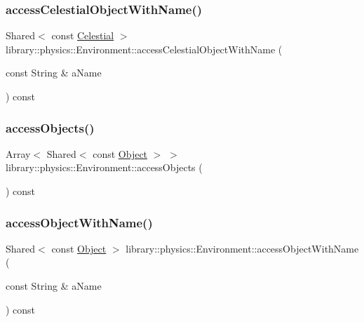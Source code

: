 \subsubsection{\texorpdfstring{access\+Celestial\+Object\+With\+Name()}{accessCelestialObjectWithName()}}
{\footnotesize\ttfamily Shared$<$ const \hyperlink{classlibrary_1_1physics_1_1env_1_1obj_1_1_celestial}{Celestial} $>$ library\+::physics\+::\+Environment\+::access\+Celestial\+Object\+With\+Name (\begin{DoxyParamCaption}\item[{const String \&}]{a\+Name }\end{DoxyParamCaption}) const}

\mbox{\label{classlibrary_1_1physics_1_1_environment_a109b7156dadfe992126e01c629146a75}} 
\subsubsection{\texorpdfstring{access\+Objects()}{accessObjects()}}
{\footnotesize\ttfamily Array$<$ Shared$<$ const \hyperlink{classlibrary_1_1physics_1_1env_1_1_object}{Object} $>$ $>$ library\+::physics\+::\+Environment\+::access\+Objects (\begin{DoxyParamCaption}{ }\end{DoxyParamCaption}) const}

\mbox{\label{classlibrary_1_1physics_1_1_environment_adb18bd17dfbffa181d7e0d868c2647a0}} 
\subsubsection{\texorpdfstring{access\+Object\+With\+Name()}{accessObjectWithName()}}
{\footnotesize\ttfamily Shared$<$ const \hyperlink{classlibrary_1_1physics_1_1env_1_1_object}{Object} $>$ library\+::physics\+::\+Environment\+::access\+Object\+With\+Name (\begin{DoxyParamCaption}\item[{const String \&}]{a\+Name }\end{DoxyParamCaption}) const}

